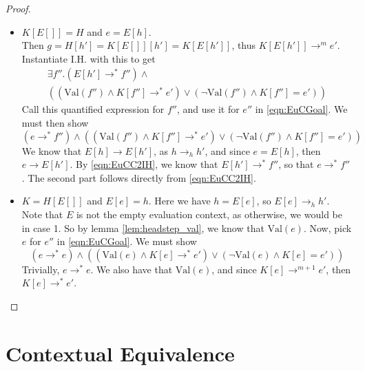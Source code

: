 \documentclass[twoside,11pt,openright]{report}
\newcommand{\expr}{e}
\newcommand{\elctx}{K}
\newcommand{\step}{\rightarrow}
\newcommand{\stepS}{\rightarrow^*}
\newcommand{\hstep}{\rightarrow_h}
\newcommand{\Val}[1]{\mathrm{Val}(#1)}
\begin{document}
\begin{proof}
\begin{itemize}
\begin{itemize}
      \item $\elctx[E[]] = H$ and $\expr = E[h]$.\\
        Then $g = H[h'] = \elctx[E[]][h'] = \elctx[E[h']]$, thus $\elctx[E[h']] \step^m \expr'$. Instantiate I.H. with this to get
        \begin{multline}\label{eqn:EuCC2IH}
          \exists f'' . (E[h'] \stepS f'') \land\\
          \left((\Val{f''} \land \elctx[f''] \stepS \expr') \lor
          (\neg \Val{f''} \land \elctx[f''] = \expr') \right)
        \end{multline}
        Call this quantified expression for $f''$, and use it for $\expr''$ in \ref{eqn:EuCGoal}. We must then show
        \begin{equation*}
          (\expr \stepS f'') \land 
          \left( (\Val{f''} \land \elctx[f''] \stepS \expr') \lor
          (\neg \Val{f''} \land \elctx[f''] = \expr') \right)
        \end{equation*}
        We know that $E[h] \step E[h']$, as $h \hstep h'$, and since $\expr = E[h]$, then $\expr \step E[h']$. By 
        \ref{eqn:EuCC2IH}, we know that $E[h'] \stepS f''$, so that $\expr \stepS f''$. The second part follows directly from \ref{eqn:EuCC2IH}.

      \item $\elctx = H[E[]]$ and $E[\expr] = h$.
        Here we have $h = E[\expr]$, so $E[\expr] \hstep h'$. Note that $E$ is not the empty evaluation context, as otherwise, we would be in case 1. So by lemma \ref{lem:headstep_val}, we know that $\Val{\expr}$. Now, pick $\expr$ for $\expr''$ in \ref{eqn:EuCGoal}. We must show 
        \begin{equation*}
          (\expr \stepS \expr) \land 
          \left( (\Val{\expr} \land \elctx[\expr] \stepS \expr') \lor
          (\neg \Val{\expr} \land \elctx[\expr] = \expr') \right)
        \end{equation*}
        Trivially, $\expr \stepS \expr$. We also have that $\Val{\expr}$, and since $\elctx[\expr] \step^{m + 1} \expr'$, then $\elctx[\expr] \stepS \expr'$.
    \end{itemize}
  \end{itemize}

\end{proof}



\chapter{Contextual Equivalence}
\label{ch:CE}
\end{document}
